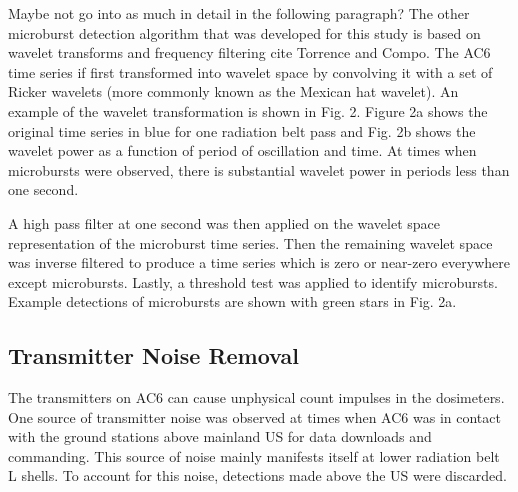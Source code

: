 \documentclass[draft]{agujournal2019}
\begin{document}
Maybe not go into as much in detail in the following paragraph? The other microburst detection algorithm that was developed for this study is based on wavelet transforms and frequency filtering cite Torrence and Compo. The AC6 time series if first transformed into wavelet space by convolving it with a set of Ricker wavelets (more commonly known as the Mexican hat wavelet). An example of the wavelet transformation is shown in Fig. 2. Figure 2a shows the original time series in blue for one radiation belt pass and Fig. 2b shows the wavelet power as a function of period of oscillation and time. At times when microbursts were observed, there is substantial wavelet power in periods less than one second.

A high pass filter at one second was then applied on the wavelet space representation of the microburst time series. Then the remaining wavelet space was inverse filtered to produce a time series which is zero or near-zero everywhere except microbursts. Lastly, a threshold test was applied to identify microbursts. Example detections of microbursts are shown with green stars in Fig. 2a.

\subsection{Transmitter Noise Removal}
The transmitters on AC6 can cause unphysical count impulses in the dosimeters. One source of transmitter noise was observed at times when AC6 was in contact with the ground stations above mainland US for data downloads and commanding. This source of noise mainly manifests itself at lower radiation belt L shells. To account for this noise, detections made above the US were discarded.
\end{document}
